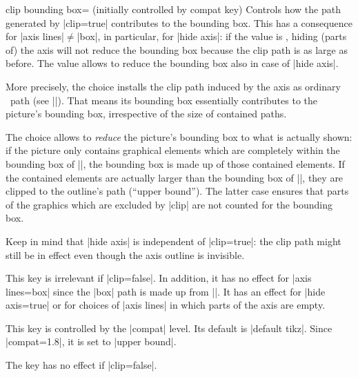\begin{pgfplotskey}{clip bounding box= (initially controlled by compat key)}
	Controls how the path generated by |clip=true| contributes to the bounding box. This has a consequence for |axis lines|$\neq$|box|, in particular, for |hide axis|: if the value is , hiding (parts of) the axis will not reduce the bounding box because the clip path is as large as before. The value  allows to reduce the bounding box also in case of |hide axis|. 

	More precisely, the choice  installs the clip path induced by the axis  as ordinary \tikzname\ path (see |\pgfplotspathaxisoutline|). That means its bounding box essentially contributes to the picture's bounding box, irrespective of the size of contained paths.

	The choice  allows to \emph{reduce} the picture's bounding box to what is actually shown: if the picture only contains graphical elements which are completely within the bounding box of |\pgfplotspathaxisoutline|, the bounding box is made up of those contained elements. If the contained elements are actually larger than the bounding box of |\pgfplotspathaxisoutline|, they are clipped to the outline's path (``upper bound''). The latter case ensures that parts of the graphics which are excluded by |clip| are not counted for the bounding box.

	Keep in mind that |hide axis| is independent of |clip=true|: the clip path might still be in effect even though the axis outline is invisible.

	This key is irrelevant if |clip=false|. In addition, it has no effect for |axis lines=box| since the |box| path is made up from |\pgfplotspathaxisoutline|. It has an effect for |hide axis=true| or for choices of |axis lines| in which parts of the axis are empty. 

	This key is controlled by the |compat| level. Its default is |default tikz|. Since |compat=1.8|, it is set to |upper bound|.

	The key has no effect if |clip=false|.
\end{pgfplotskey}

